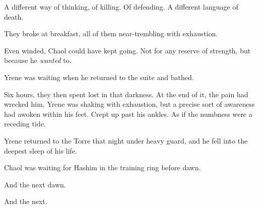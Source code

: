A different way of thinking, of killing. Of defending. A different language of death.

They broke at breakfast, all of them near-trembling with exhaustion.

Even winded, Chaol could have kept going. Not for any reserve of strength, but because he \emph{wanted} to.

Yrene was waiting when he returned to the suite and bathed.

Six hours, they then spent lost in that darkness. At the end of it, the pain had wrecked him, Yrene was shaking with exhaustion, but a precise sort of awareness had awoken within his feet. Crept up past his ankles. As if the numbness were a receding tide.

Yrene returned to the Torre that night under heavy guard, and he fell into the deepest sleep of his life.

Chaol was waiting for Hashim in the training ring before dawn.

And the next dawn.

And the next.

